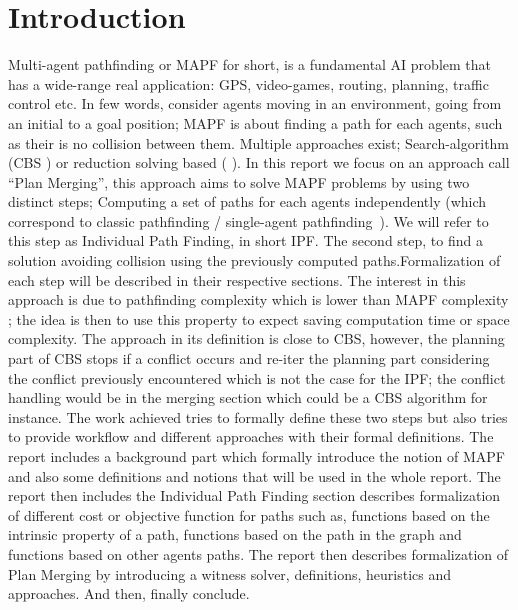 \section{Introduction}
Multi-agent pathfinding or MAPF \cite{ststfekomawaliatcokubabo19a,ststfekomawaliatcokubabo19b,stern19a} for short, is a fundamental AI problem that has a wide-range real application: GPS, video-games, routing, planning, traffic control etc. In few words, consider agents moving in an environment, going from an initial to a goal position; MAPF is about finding a path for each agents, such as their is no collision between them. Multiple approaches exist; Search-algorithm (CBS \cite{shstfest15a}) or reduction solving based ( \cite{barsva19a}). 
In this report we focus on an approach call ``Plan Merging'', this approach aims to solve MAPF problems by using two distinct steps; Computing a set of paths for each agents independently (which correspond to classic pathfinding / single-agent pathfinding~\cite{foghkuhagu21a}). We will refer to this step as Individual Path Finding, in short IPF. The second step, to find a solution avoiding collision using the previously computed paths.Formalization of each step will be described in their respective sections. The interest in this approach is due to pathfinding complexity which is lower than MAPF complexity \cite{nebel19a}; the idea is then to use this property to expect saving computation time or space complexity. 
The approach in its definition is close to CBS, however, the planning part of CBS stops if a conflict occurs and re-iter the planning part considering the conflict previously encountered which is not the case for the IPF; the conflict handling would be in the merging section which could be a CBS algorithm for instance.
The work achieved tries to formally define these two steps but also tries to provide workflow and different approaches with their formal definitions. The report includes a background part which formally introduce the notion of MAPF and also some definitions and notions that will be used in the whole report. The report then includes the Individual Path Finding section describes formalization of different cost or objective function for paths such as, functions based on the intrinsic property of a path, functions based on the path in the graph and functions based on other agents paths. The report then describes formalization of Plan Merging by introducing a witness solver, definitions, heuristics and approaches. And then, finally conclude. 


